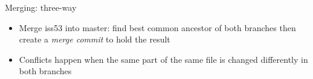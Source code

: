 \documentclass{beamer}
\begin{document}
\begin{frame}[b]{Merging: three-way}
  \begin{center}
  \end{center}
  \begin{itemize}
  \item Merge iss53 into master: find best common ancestor of both branches then create a \emph{merge commit} to hold the result
  \item Conflicts happen when the same part of the same file is changed differently in both branches
  \end{itemize}
\end{frame}
\end{document}
